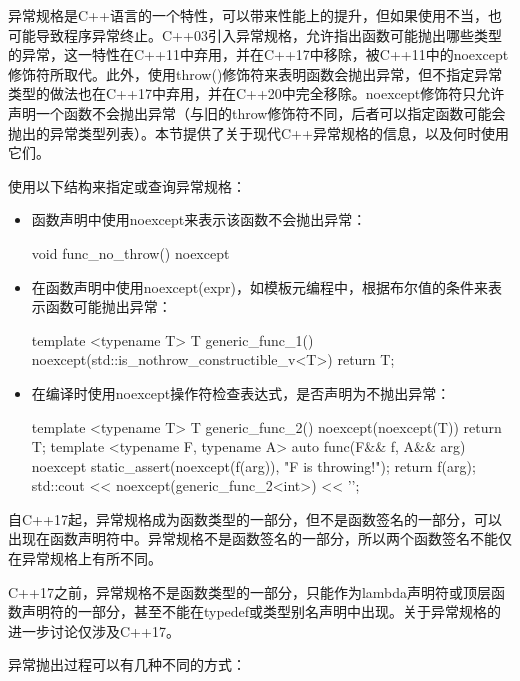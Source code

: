 
异常规格是C++语言的一个特性，可以带来性能上的提升，但如果使用不当，也可能导致程序异常终止。C++03引入异常规格，允许指出函数可能抛出哪些类型的异常，这一特性在C++11中弃用，并在C++17中移除，被C++11中的noexcept修饰符所取代。此外，使用throw()修饰符来表明函数会抛出异常，但不指定异常类型的做法也在C++17中弃用，并在C++20中完全移除。noexcept修饰符只允许声明一个函数不会抛出异常（与旧的throw修饰符不同，后者可以指定函数可能会抛出的异常类型列表）。本节提供了关于现代C++异常规格的信息，以及何时使用它们。


使用以下结构来指定或查询异常规格：

\begin{itemize}
\item
函数声明中使用noexcept来表示该函数不会抛出异常：

\begin{cpp}
void func_no_throw() noexcept
{
}
\end{cpp}

\item
在函数声明中使用noexcept(expr)，如模板元编程中，根据布尔值的条件来表示函数可能抛出异常：

\begin{cpp}
template <typename T>
T generic_func_1()
noexcept(std::is_nothrow_constructible_v<T>)
{
    return T{};
}
\end{cpp}

\item
在编译时使用noexcept操作符检查表达式，是否声明为不抛出异常：

\begin{cpp}
template <typename T>
T generic_func_2() noexcept(noexcept(T{}))
{
    return T{};
}
template <typename F, typename A>
auto func(F&& f, A&& arg) noexcept
{
    static_assert(noexcept(f(arg)), "F is throwing!");
    return f(arg);
}
std::cout << noexcept(generic_func_2<int>) << '\n';
\end{cpp}
\end{itemize}


自C++17起，异常规格成为函数类型的一部分，但不是函数签名的一部分，可以出现在函数声明符中。异常规格不是函数签名的一部分，所以两个函数签名不能仅在异常规格上有所不同。

C++17之前，异常规格不是函数类型的一部分，只能作为lambda声明符或顶层函数声明符的一部分，甚至不能在typedef或类型别名声明中出现。关于异常规格的进一步讨论仅涉及C++17。

异常抛出过程可以有几种不同的方式：

